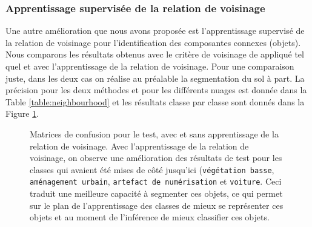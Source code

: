\documentclass[a4paper, onecolumn, 11pt]{article}
\begin{document}
\subsubsection{Apprentissage supervisée de la relation de voisinage}

Une autre amélioration que nous avons proposée est l'apprentissage supervisé de la relation de voisinage pour l'identification des composantes connexes (objets). Nous comparons les résultats obtenus avec le critère de voisinage de \cite{aka_article} appliqué tel quel et avec l'apprentissage de la relation de voisinage. Pour une comparaison juste, dans les deux cas on réalise au préalable la segmentation du sol à part. La précision pour les deux méthodes et pour les différents nuages est donnée dans la Table \ref{table:neighbourhood} et les résultats classe par classe sont donnés dans la Figure \ref{fig:neighbourhood}.

\begin{figure}
    \centering
    \qquad
    \caption{Matrices de confusion pour le test, avec et sans apprentissage de la relation de voisinage. Avec l'apprentissage de la relation de voisinage, on observe une amélioration des résultats de test pour les classes qui avaient été mises de côté jusqu'ici (\texttt{végétation basse}, \texttt{aménagement urbain}, \texttt{artefact de numérisation} et \texttt{voiture}. Ceci traduit une meilleure capacité à segmenter ces objets, ce qui permet sur le plan de l'apprentissage des classes de mieux se représenter ces objets et au moment de l'inférence de mieux classifier ces objets.}
    \label{fig:neighbourhood}
\end{figure}
\end{document}
